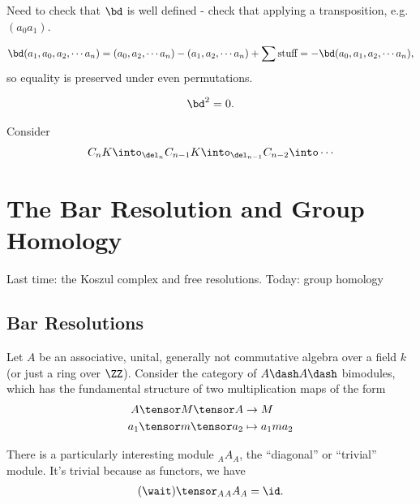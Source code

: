 Need to check that \(\bd\) is well defined - check that applying a
transposition, e.g.~\((a_0 a_1)\).

\begin{align*}
\bd (a_1, a_0, a_2, \cdots a_n) = (a_0, a_2, \cdots a_n) - (a_1, a_2, \cdots a_n) + \sum \text{stuff} = -\bd (a_0, a_1, a_2, \cdots a_n)
,\end{align*} so equality is preserved under even permutations.

\begin{proposition}

\begin{align*}  
\bd^2 = 0
.\end{align*}

\end{proposition}

Consider
\begin{align*}
C_n K \into_{\del_n} C_{n-1} K \into_{\del_{n-1}} C_{n-2} \into \cdots
\end{align*}

\hypertarget{the-bar-resolution-and-group-homology}{%
\section{The Bar Resolution and Group
Homology}\label{the-bar-resolution-and-group-homology}}

Last time: the Koszul complex and free resolutions. Today: group
homology

\hypertarget{bar-resolutions}{%
\subsection{Bar Resolutions}\label{bar-resolutions}}

Let \(A\) be an associative, unital, generally not commutative algebra
over a field \(k\) (or just a ring over \(\ZZ\)). Consider the category
of \(A\dash A\dash\) bimodules, which has the fundamental structure of
two multiplication maps of the form
\begin{align*}
A\tensor M \tensor A &\to M\\
a_1\tensor m \tensor a_2 &\mapsto a_1 m a_2
\end{align*}

There is a particularly interesting module \({}_A A_A\), the
``diagonal'' or ``trivial'' module. It's trivial because as functors, we
have
\begin{align*}
(\wait)\tensor_A {}_A A_A = \id
.\end{align*}

